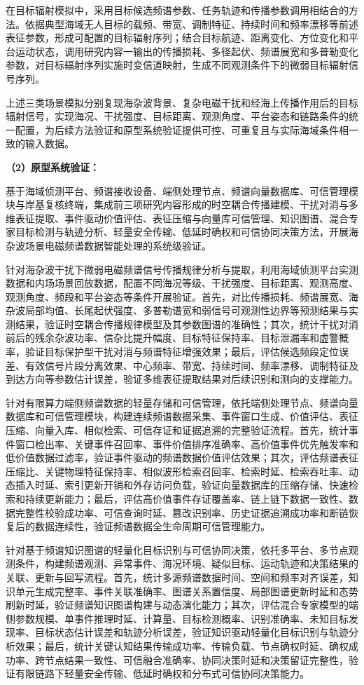 在目标辐射模拟中，采用目标候选频谱参数、任务轨迹和传播参数调用相结合的方法。依据典型海域无人目标的载频、带宽、调制特征、持续时间和频率漂移等前述表征参数，形成可配置的目标辐射序列；结合目标航迹、距离变化、方位变化和平台运动状态，调用研究内容一输出的传播损耗、多径起伏、频谱展宽和多普勒变化参数，对目标辐射序列实施时变信道映射，生成不同观测条件下的微弱目标辐射信号序列。

上述三类场景模拟分别复现海杂波背景、复杂电磁干扰和经海上传播作用后的目标辐射信号，实现海况、干扰强度、目标距离、观测角度、平台姿态和链路条件的统一配置，为后续方法验证和原型系统验证提供可控、可重复且与实际海域条件相一致的输入数据。

\textbf{（2）原型系统验证：}

基于海域侦测平台、频谱接收设备、端侧处理节点、频谱向量数据库、可信管理模块与岸基复核终端，集成前三项研究内容形成的时空耦合传播建模、干扰对消与多维表征提取、事件驱动价值评估、表征压缩与向量库可信管理、知识图谱、混合专家目标检测与轨迹分析、轻量安全传输、低延时确权和可信协同决策方法，开展海杂波场景电磁频谱数据智能处理的系统级验证。

针对海杂波干扰下微弱电磁频谱信号传播规律分析与提取，利用海域侦测平台实测数据和内场场景回放数据，配置不同海况等级、干扰强度、目标距离、观测高度、观测角度、频段和平台姿态等条件开展验证。首先，对比传播损耗、频谱展宽、海杂波局部均值、长尾起伏强度、多普勒谱宽和弱信号可观测性边界等预测结果与实测结果，验证时空耦合传播规律模型及其参数图谱的准确性；其次，统计干扰对消前后的残余杂波功率、信杂比提升幅度、目标特征保持率、目标泄漏率和虚警概率，验证目标保护型干扰对消与频谱特征增强效果；最后，评估候选频段定位误差、有效信号片段分离效果、中心频率、带宽、持续时间、频率漂移、调制特征及到达方向等参数估计误差，验证多维表征提取结果对后续识别和测向的支撑能力。

针对有限算力端侧频谱数据的轻量存储和可信管理，依托端侧处理节点、频谱向量数据库和可信管理模块，构建连续频谱数据采集、事件窗口生成、价值评估、表征压缩、向量入库、相似检索、可信存证和证据追溯的完整验证流程。首先，统计事件窗口检出率、关键事件召回率、事件价值排序准确率、高价值事件优先触发率和低价值数据过滤率，验证事件驱动的频谱数据价值评估效果；其次，评估频谱表征压缩比、关键物理特征保持率、相似波形检索召回率、检索时延、检索吞吐率、动态插入时延、索引更新开销和外存访问负载，验证向量数据库的压缩存储、快速检索和持续更新能力；最后，评估高价值事件存证覆盖率、链上链下数据一致性、数据完整性校验成功率、可信查询时延、篡改识别率、历史证据追溯成功率和断链恢复后的数据连续性，验证频谱数据全生命周期可信管理能力。

针对基于频谱知识图谱的轻量化目标识别与可信协同决策，依托多平台、多节点观测条件，构建频谱观测、异常事件、海况环境、疑似目标、运动轨迹和决策结果的关联、更新与回写流程。首先，统计多源频谱数据时间、空间和频率对齐误差，知识单元生成完整率、事件关联准确率、图谱关系置信度、局部图谱更新时延和态势刷新时延，验证频谱知识图谱构建与动态演化能力；其次，评估混合专家模型的端侧参数规模、单事件推理时延、计算量、目标检测概率、识别准确率、未知目标发现率、目标状态估计误差和轨迹分析误差，验证知识驱动轻量化目标识别与轨迹分析效果；最后，统计关键认知结果传输成功率、传输负载、节点确权时延、确权成功率、跨节点结果一致性、可信融合准确率、协同决策时延和决策留证完整性，验证有限链路下轻量安全传输、低延时确权和分布式可信协同决策能力。

